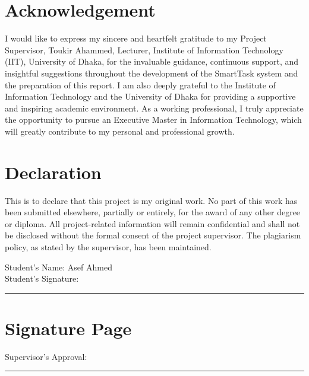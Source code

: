 \documentclass[12pt,a4paper]{report}
\begin{document}
\chapter*{Acknowledgement}
I would like to express my sincere and heartfelt gratitude to my Project
Supervisor, Toukir Ahammed, Lecturer, Institute of
Information Technology (IIT), University of Dhaka, for the invaluable guidance,
continuous support, and insightful suggestions throughout the development of the
SmartTask system and the preparation of this report. I am also deeply grateful 
to the Institute of Information Technology and the University of Dhaka for providing 
a supportive and inspiring academic environment. As a working professional, I truly 
appreciate the opportunity to pursue an Executive Master in Information Technology, 
which will greatly contribute to my personal and professional growth.

\chapter*{Declaration}
This is to declare that this project is my original work. No part of this work
has been submitted elsewhere, partially or entirely, for the award of any other
degree or diploma. All project-related information will remain confidential and
shall not be disclosed without the formal consent of the project supervisor. The
plagiarism policy, as stated by the supervisor, has been maintained.

\vspace{1.5cm}
\noindent Student's Name: Asef Ahmed\\
Student's Signature: \rule{5cm}{0.4pt}

\chapter*{Signature Page}
\begin{center}
\end{center}
\vspace{1cm}
\noindent Supervisor's Approval: \rule{6cm}{0.4pt}
\end{document}
